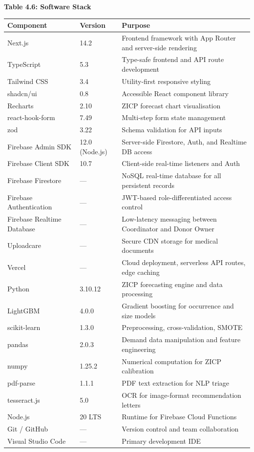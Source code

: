 \documentclass[12pt,a4paper]{article}
\begin{document}
\begin{center}
\textbf{Table 4.6: Software Stack}
\vspace{0.4em}
\begin{tabular}{p{3.5cm} p{3cm} p{6cm}}
\toprule
\textbf{Component} & \textbf{Version} & \textbf{Purpose} \\
\midrule
Next.js & 14.2 & Frontend framework with App Router and server-side rendering \\
TypeScript & 5.3 & Type-safe frontend and API route development \\
Tailwind CSS & 3.4 & Utility-first responsive styling \\
shadcn/ui & 0.8 & Accessible React component library \\
Recharts & 2.10 & ZICP forecast chart visualisation \\
react-hook-form & 7.49 & Multi-step form state management \\
zod & 3.22 & Schema validation for API inputs \\
Firebase Admin SDK & 12.0 (Node.js) & Server-side Firestore, Auth, and Realtime DB access \\
Firebase Client SDK & 10.7 & Client-side real-time listeners and Auth \\
Firebase Firestore & — & NoSQL real-time database for all persistent records \\
Firebase Authentication & — & JWT-based role-differentiated access control \\
Firebase Realtime Database & — & Low-latency messaging between Coordinator and Donor Owner \\
Uploadcare & — & Secure CDN storage for medical documents \\
Vercel & — & Cloud deployment, serverless API routes, edge caching \\
Python & 3.10.12 & ZICP forecasting engine and data processing \\
LightGBM & 4.0.0 & Gradient boosting for occurrence and size models \\
scikit-learn & 1.3.0 & Preprocessing, cross-validation, SMOTE \\
pandas & 2.0.3 & Demand data manipulation and feature engineering \\
numpy & 1.25.2 & Numerical computation for ZICP calibration \\
pdf-parse & 1.1.1 & PDF text extraction for NLP triage \\
tesseract.js & 5.0 & OCR for image-format recommendation letters \\
Node.js & 20 LTS & Runtime for Firebase Cloud Functions \\
Git / GitHub & — & Version control and team collaboration \\
Visual Studio Code & — & Primary development IDE \\
\bottomrule
\end{tabular}
\end{center}
\end{document}
